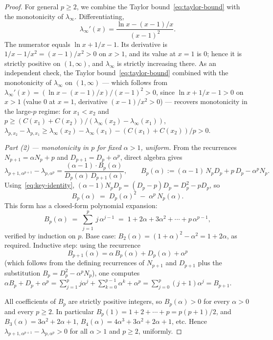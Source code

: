 \documentclass[11pt,a4paper]{article}
\theoremstyle{definition}
\begin{document}
\begin{proof}
For general $p \geq 2$, we combine the Taylor bound~\eqref{eq:taylor-bound} with the monotonicity of $\lambda_\infty$. Differentiating,
\[
  \lambda_\infty'(x)
  = \frac{\ln x - (x-1)/x}{(x-1)^2}.
\]
The numerator equals $\ln x + 1/x - 1$. Its derivative is $1/x - 1/x^2 = (x-1)/x^2 > 0$ on $x > 1$, and its value at $x = 1$ is $0$; hence it is strictly positive on $(1, \infty)$, and $\lambda_\infty$ is strictly increasing there. As an independent check, the Taylor bound~\eqref{eq:taylor-bound} combined with the monotonicity of $\lambda_\infty$ on $(1, \infty)$ --- which follows from $\lambda_\infty'(x) = (\ln x - (x-1)/x)/(x-1)^2 > 0$, since $\ln x + 1/x - 1 > 0$ on $x > 1$ (value $0$ at $x = 1$, derivative $(x-1)/x^2 > 0$) --- recovers monotonicity in the large-$p$ regime: for $x_1 < x_2$ and $p \geq (C(x_1) + C(x_2))/(\lambda_\infty(x_2) - \lambda_\infty(x_1))$, $\lambda_{p,x_2} - \lambda_{p,x_1} \geq \lambda_\infty(x_2) - \lambda_\infty(x_1) - (C(x_1) + C(x_2))/p > 0$.

\medskip

\medskip

\noindent\emph{Part (2) --- monotonicity in $p$ for fixed $\alpha > 1$, uniform.} From the recurrences $N_{p+1} = \alpha N_p + p$ and $D_{p+1} = D_p + \alpha^p$, direct algebra gives
\[
  \lambda_{p+1,\alpha^{p+1}} - \lambda_{p,\alpha^p}
  = \frac{(\alpha-1)\cdot B_p(\alpha)}{D_p(\alpha)\,D_{p+1}(\alpha)},
  \qquad
  B_p(\alpha) := (\alpha-1)\, N_p D_p + p\, D_p - \alpha^p N_p.
\]
Using~\eqref{eq:key-identity}, $(\alpha-1) N_p D_p = (D_p - p) D_p = D_p^2 - p D_p$, so
\[
  B_p(\alpha) \;=\; D_p(\alpha)^2 \;-\; \alpha^p\, N_p(\alpha).
\]
This form has a closed-form polynomial expansion:
\begin{equation}\label{eq:Bp-closed}
  B_p(\alpha) \;=\; \sum_{j=1}^{p}\, j\, \alpha^{j-1}
  \;=\; 1 + 2\alpha + 3\alpha^2 + \cdots + p\, \alpha^{p-1},
\end{equation}
verified by induction on $p$. Base case: $B_2(\alpha) = (1+\alpha)^2 - \alpha^2 = 1 + 2\alpha$, as required. Inductive step: using the recurrence
\[
  B_{p+1}(\alpha) = \alpha\, B_p(\alpha) + D_p(\alpha) + \alpha^p
\]
(which follows from the defining recurrences of $N_{p+1}$ and $D_{p+1}$ plus the substitution $B_p = D_p^2 - \alpha^p N_p$), one computes $\alpha B_p + D_p + \alpha^p = \sum_{j=1}^{p} j\alpha^j + \sum_{k=0}^{p-1}\alpha^k + \alpha^p = \sum_{j=0}^{p} (j+1)\alpha^j = B_{p+1}$.

All coefficients of $B_p$ are strictly positive integers, so $B_p(\alpha) > 0$ for every $\alpha > 0$ and every $p \geq 2$. In particular $B_p(1) = 1 + 2 + \cdots + p = p(p+1)/2$, and $B_3(\alpha) = 3\alpha^2 + 2\alpha + 1$, $B_4(\alpha) = 4\alpha^3 + 3\alpha^2 + 2\alpha + 1$, etc. Hence $\lambda_{p+1,\alpha^{p+1}} - \lambda_{p,\alpha^p} > 0$ for all $\alpha > 1$ and $p \geq 2$, uniformly.
\end{proof}
\end{document}
